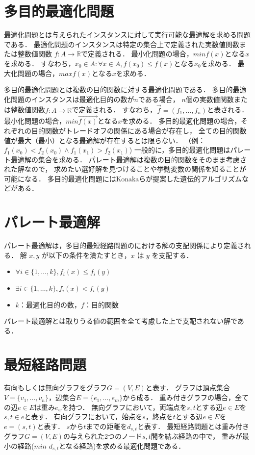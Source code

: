 \documentclass[12pt]{optlab-bachelor}
\begin{document}
\section{多目的最適化問題}
最適化問題とは与えられたインスタンスに対して実行可能な最適解を求める問題である．
最適化問題のインスタンスは特定の集合上で定義された実数値関数または整数値関数
$f : A \rightarrow \mathbb{R}$で定義される．
最小化問題の場合，$minf(x)$となる$x$を求める．
すなわち，$x_0 \in A : \forall x\in A , f(x_0) \leq f(x) $となる$x_0$を求める．
最大化問題の場合，$maxf(x)$となる$x$を求める．

多目的最適化問題とは複数の目的関数に対する最適化問題である．
多目的最適化問題のインスタンスは最適化目的の数が$n$である場合，
$n$個の実数値関数または整数値関数$f : A \rightarrow \mathbb{R}$で定義される．
すなわち，$\vec{f} = (f_1 , \ldots , f_n)$と表される．
最小化問題の場合，$min\vec{f(x)}$となる$x$を求める．
多目的最適化問題の場合，それぞれの目的関数がトレードオフの関係にある場合が存在し，
全ての目的関数値が最大（最小）となる最適解が存在するとは限らない．
（例：$f_1(x_0) < f_2(x_0) \land f_1(x_1) > f_2(x_1)$)
一般的に，多目的最適化問題はパレート最適解の集合を求める．
パレート最適解は複数の目的関数をそのまま考慮された解なので，
求めたい選好解を見つけることや挙動変数の関係を知ることが可能になる．
多目的最適化問題にはKonakaら\cite{Konaka}が提案した遺伝的アルゴリズムなどがある．

\section{パレート最適解}
パレート最適解は，多目的最短経路問題のにおける解の支配関係により定義される．
解 $x,y$ が以下の条件を満たすとき，$x$ は $y$ を支配する．
\begin{itemize}
\item $\forall i \in \{1,\ldots,k\},f_i(x) \le f_i(y)$
\item $\exists i \in \{1,\ldots,k\},f_i(x) < f_i(y)$
\item $k$：最適化目的の数，$f$：目的関数
\end{itemize}
パレート最適解とは取りうる値の範囲を全て考慮した上で支配されない解である．

\section{最短経路問題}
有向もしくは無向グラフをグラフ$G=(V,E)$と表す．
グラフは頂点集合$V=\{v_1,\ldots,v_n\}$，辺集合$E=\{e_1,\ldots,e_m\}$から成る．
重み付きグラフの場合，全ての辺$e\in E$は重み$e_w$を持つ．
無向グラフにおいて，両端点を$s,t$とする辺$e \in E$を$s,t \in e$と表す．
有向グラフにおいて，始点を$s$，終点を$t$とする辺$e \in E$を$e=(s,t)$と表す．
$s$から$t$までの距離を$d_{s,t}$と表す．
最短経路問題とは重み付きグラフ$G=(V,E)$の与えられた2つのノード$s,t$間を結ぶ経路の中で，
重みが最小の経路($min$ $d_{s,t}$となる経路)を求める最適化問題である．
\end{document}

